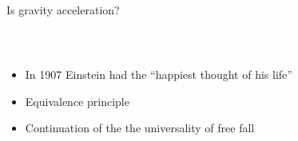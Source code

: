 \documentclass{beamer}
\begin{document}
\begin{frame}{Is gravity acceleration?}
  \begin{columns}
    \begin{column}{0.4\textwidth}
      ~\vspace{1.5cm}
      \begin{itemize}
      \item{In 1907 Einstein had the ``happiest thought of his life''}
      \item<2->{Equivalence principle}
      \item<4->{Continuation of the the universality of free fall}
         
      \end{itemize}
       ~\vspace{1.5cm}
         \end{column}
    \begin{column}{0.6\textwidth}
      \begin{center}
\end{center}
\end{column}
\end{columns}
\end{frame}
\end{document}
